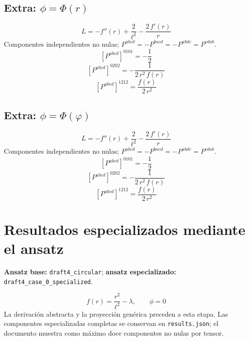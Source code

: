 \documentclass[11pt]{article}
\begin{document}
\subsection*{Extra: $\phi=\Phi\!\left(r\right)$}
\begin{dmath*}[breakdepth={5}]
L=-f''\!\left(r\right) + \frac{2}{{\ell}^{2}} - \frac{2\,f'\!\left(r\right)}{r}
\end{dmath*}
Componentes independientes no nulas; $P^{abcd}=-P^{bacd}=-P^{abdc}=P^{cdab}$.
\begin{dmath*}[breakdepth={5}]
\left[P^{abcd}\right]^{0101}=-\frac{1}{2}
\end{dmath*}
\begin{dmath*}[breakdepth={5}]
\left[P^{abcd}\right]^{0202}=-\frac{1}{2\,{r}^{2}\,f\!\left(r\right)}
\end{dmath*}
\begin{dmath*}[breakdepth={5}]
\left[P^{abcd}\right]^{1212}=\frac{f\!\left(r\right)}{2\,{r}^{2}}
\end{dmath*}
\subsection*{Extra: $\phi=\Phi\!\left(\varphi\right)$}
\begin{dmath*}[breakdepth={5}]
L=-f''\!\left(r\right) + \frac{2}{{\ell}^{2}} - \frac{2\,f'\!\left(r\right)}{r}
\end{dmath*}
Componentes independientes no nulas; $P^{abcd}=-P^{bacd}=-P^{abdc}=P^{cdab}$.
\begin{dmath*}[breakdepth={5}]
\left[P^{abcd}\right]^{0101}=-\frac{1}{2}
\end{dmath*}
\begin{dmath*}[breakdepth={5}]
\left[P^{abcd}\right]^{0202}=-\frac{1}{2\,{r}^{2}\,f\!\left(r\right)}
\end{dmath*}
\begin{dmath*}[breakdepth={5}]
\left[P^{abcd}\right]^{1212}=\frac{f\!\left(r\right)}{2\,{r}^{2}}
\end{dmath*}
\section*{Resultados especializados mediante el ansatz}
\textbf{Ansatz base:} \texttt{draft4\_circular}; \textbf{ansatz especializado:} \texttt{draft4\_case\_0\_specialized}.\par
\begin{dmath*}[breakdepth={4}]
f\!\left(r\right) = \frac{{r}^{2}}{{\ell}^{2}} - \lambda,\qquad \phi = 0
\end{dmath*}
La derivación abstracta y la proyección genérica preceden a esta etapa. Las componentes especializadas completas se conservan en \texttt{results.json}; el documento muestra como máximo doce componentes no nulas por tensor.
\end{document}
